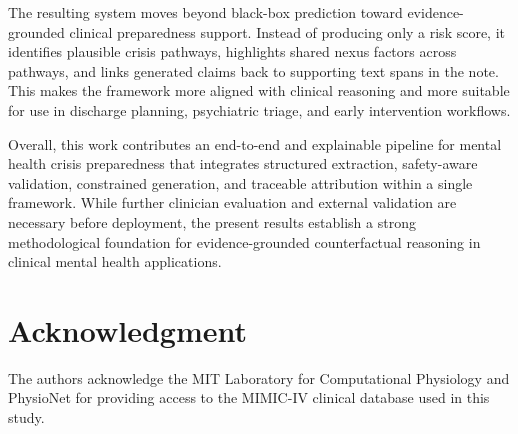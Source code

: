 \documentclass[conference]{IEEEtran}
\begin{document}
The resulting system moves beyond black-box prediction toward evidence-grounded clinical preparedness support. Instead of producing only a risk score, it identifies plausible crisis pathways, highlights shared nexus factors across pathways, and links generated claims back to supporting text spans in the note. This makes the framework more aligned with clinical reasoning and more suitable for use in discharge planning, psychiatric triage, and early intervention workflows.

Overall, this work contributes an end-to-end and explainable pipeline for mental health crisis preparedness that integrates structured extraction, safety-aware validation, constrained generation, and traceable attribution within a single framework. While further clinician evaluation and external validation are necessary before deployment, the present results establish a strong methodological foundation for evidence-grounded counterfactual reasoning in clinical mental health applications.

\section*{Acknowledgment}

The authors acknowledge the MIT Laboratory for Computational Physiology and PhysioNet for providing access to the MIMIC-IV clinical database used in this study.
\end{document}
